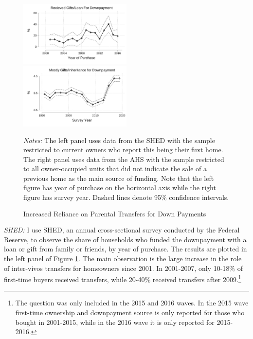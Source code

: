 \documentclass[12pt]{article}
\begin{document}
\begin{figure}
	\caption{Increased Reliance on Parental Transfers for Down Payments}\label{fig:motivation}
	\includegraphics[width=0.5\textwidth]{../tabfig/descr/SHED_gift_scatter_SE_paper}%
	\includegraphics[width=0.5\textwidth]{../tabfig/descr/AHS_majorsourcedown_surveyyear_paper}%
	
	 {\begin{footnotesize} \textit{Notes:} The left panel uses data from the SHED with the sample restricted to current owners who report this being their first home. The right panel uses data from the AHS with the sample restricted to all owner-occupied units that did not indicate the sale of a previous home as the main source of funding. Note that the left figure has year of purchase on the horizontal axis while the right figure has survey year. Dashed lines denote 95\% confidence intervals.\end{footnotesize}}
\end{figure}

\textit{SHED:} I use SHED, an annual cross-sectional survey conducted by the Federal Reserve, to observe the share of households who funded the downpayment with a loan or gift from family or friends, by year of purchase. The results are plotted in the left panel of Figure \ref{fig:motivation}. The main observation is the large increase in the role of inter-vivos transfers for homeowners since 2001. In 2001-2007, only 10-18\% of first-time buyers received transfers, while 20-40\% received transfers after 2009.\footnote{The question was only included in the 2015 and 2016 waves. In the 2015 wave first-time ownership and downpayment source is only reported for those who bought in 2001-2015, while in the 2016 wave it is only reported for 2015-2016. } 
\end{document}
